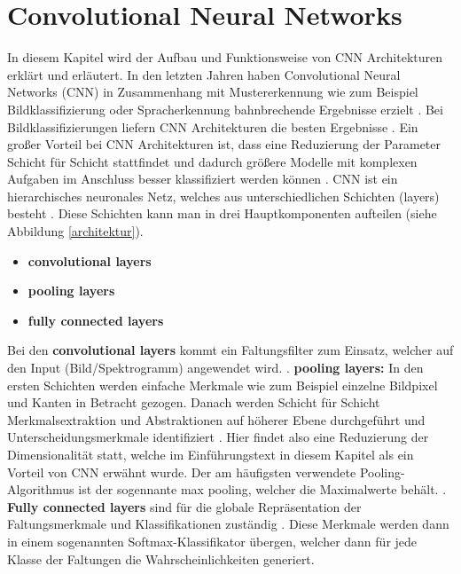 \chapter{Convolutional Neural Networks}
In diesem Kapitel wird der Aufbau und Funktionsweise von CNN Architekturen erklärt und erläutert.\newline\newline
In den letzten Jahren haben Convolutional Neural Networks (CNN) in Zusammenhang mit Mustererkennung wie zum Beispiel Bildklassifizierung oder Spracherkennung bahnbrechende Ergebnisse erzielt \cite{bilderkennung}. Bei Bildklassifizierungen liefern CNN Architekturen die besten Ergebnisse \cite{imagenet}. Ein großer Vorteil bei CNN Architekturen ist, dass eine Reduzierung der Parameter Schicht für Schicht stattfindet und dadurch größere Modelle mit komplexen Aufgaben im Anschluss besser klassifiziert werden können \cite{bilderkennung}. CNN ist ein hierarchisches neuronales Netz, welches aus unterschiedlichen Schichten (layers) besteht \cite{badshah2019deep}. Diese Schichten kann man in drei Hauptkomponenten aufteilen (siehe Abbildung \ref{architektur}).
\begin{itemize}
	\item  \textbf{convolutional layers} \cite{badshah2019deep} 
	\item  \textbf{pooling layers} \cite{badshah2019deep}
	\item  \textbf{fully connected layers} \cite{badshah2019deep}
\end{itemize}

Bei den \textbf{convolutional layers} kommt ein Faltungsfilter zum Einsatz, welcher auf den Input (Bild/Spektrogramm) angewendet wird. \cite{badshah2019deep}.\newline 
\textbf{pooling layers:} In den ersten Schichten werden einfache Merkmale wie zum Beispiel einzelne Bildpixel und Kanten in Betracht gezogen. Danach werden Schicht für Schicht Merkmalsextraktion und Abstraktionen auf höherer Ebene durchgeführt und Unterscheidungsmerkmale identifiziert \cite{badshah2019deep}. Hier findet also eine Reduzierung der Dimensionalität statt, welche im Einführungstext in diesem Kapitel als ein Vorteil von CNN erwähnt wurde. Der am häufigsten verwendete Pooling-Algorithmus ist der sogennante max pooling, welcher die Maximalwerte behält. \cite{badshah2019deep}.\newline \newline
\textbf{Fully connected layers} sind für die globale Repräsentation der Faltungsmerkmale und Klassifikationen zuständig \cite{badshah2019deep}. Diese Merkmale werden dann in einem sogenannten Softmax-Klassifikator übergen, welcher dann für jede Klasse der Faltungen die Wahrscheinlichkeiten generiert. 